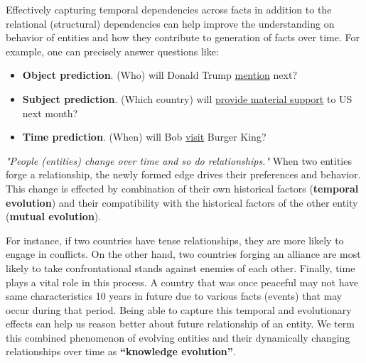 \documentclass{article}
\begin{document}
Effectively capturing temporal dependencies across facts in addition to the relational (structural) dependencies can help improve the understanding on behavior of entities and how they contribute to generation of facts over time. For example, one can precisely answer questions like:
\begin{itemize}[leftmargin=*,nosep]
\item {\bf Object prediction}. (Who) will Donald Trump \underline{mention} next? 
\vspace{0.25cm}
\item {\bf Subject prediction}. (Which country) will \underline{provide material support} to US next month? 
\vspace{0.25cm}
\item {\bf Time prediction}. (When) will Bob \underline{visit} Burger King? 
\end{itemize}

\textit{"People (entities) change over time and so do relationships."} When two entities forge a relationship, the newly formed edge drives their preferences and behavior. This change is effected by combination of their own historical factors (\textbf{{temporal evolution}}) and their compatibility with the historical factors of the other entity (\textbf{{mutual evolution}}). 

For instance, if two countries have tense relationships, they are more likely to engage in conflicts. On the other hand, two countries forging an alliance are most likely to take confrontational stands against enemies of each other. Finally, time plays a vital role in this process. A country that was once peaceful may not have same characteristics 10 years in future due to various facts (events) that may occur during that period. Being able to capture this temporal and evolutionary effects can help us reason better about future relationship of an entity. We term this combined phenomenon of evolving entities  and their dynamically changing relationships  over time as \textbf{``knowledge evolution''}.
 
\end{document}
